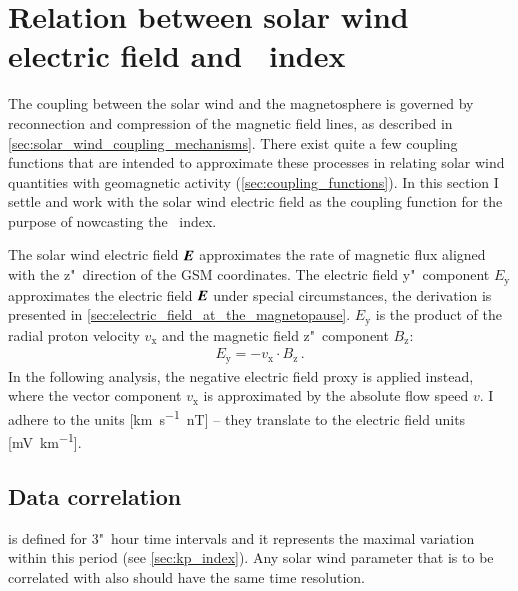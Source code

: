 \section{Relation between solar wind electric field and \Kp~index}
\label{sec:relation_between_sw_efield_and_kp}
The coupling between the solar wind and the magnetosphere is governed by reconnection and compression of the magnetic field lines, as described in \autoref{sec:solar_wind_coupling_mechanisms}. There exist quite a few coupling functions that are intended to approximate these processes in relating solar wind quantities with geomagnetic activity (\autoref{sec:coupling_functions}). In this section I settle and work with the solar wind electric field as the coupling function for the purpose of nowcasting the \Kp~index.

The solar wind electric field $\boldsymbol{E}$ approximates the rate of magnetic flux aligned with the z"~direction of the GSM coordinates. The electric field y"~component $E_\text{y}$ approximates the electric field $\boldsymbol{E}$ under special circumstances, the derivation is presented in \autoref{sec:electric_field_at_the_magnetopause}. $E_\text{y}$ is the product of the radial proton velocity $v_\text{x}$ and the magnetic field z"~component $B_\text{z}$:
\begin{align}
	E_\text{y} = -v_\text{x} \cdot B_\text{z}\,.
\end{align}
In the following analysis, the negative electric field proxy \vBz{} is applied instead, where the vector component $v_\text{x}$ is approximated by the absolute flow speed $v$. I adhere to the units [\si{\km\per\s\nano\tesla}] -- they translate to the electric field units [\si{\milli\volt\per\km}].




\subsection{Data correlation}
\label{sec:data_correlation}
\Kp{} is defined for 3"~hour time intervals and it represents the maximal variation within this period (see \autoref{sec:kp_index}). Any solar wind parameter that is to be correlated with \Kp{} also should have the same time resolution.


